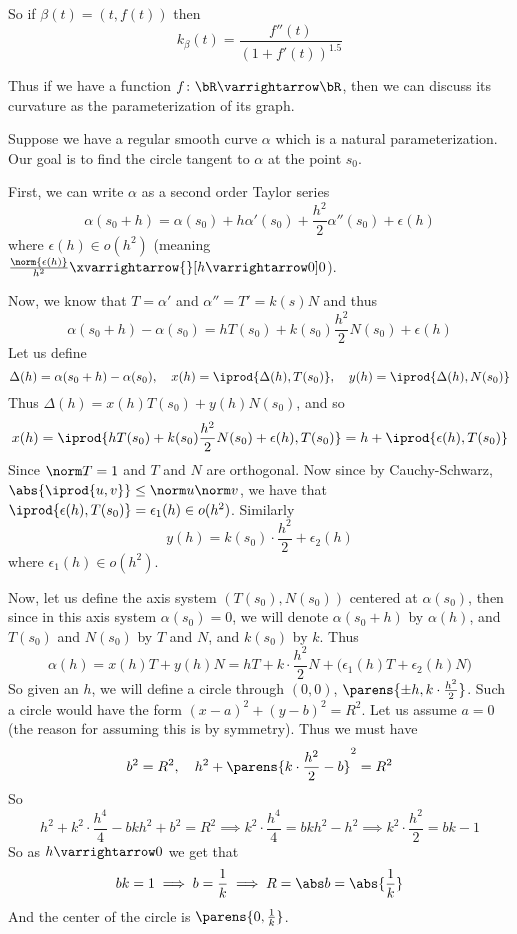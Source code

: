 \documentclass[10pt]{article}
\let\to=\varrightarrow
\begin{document}
\begin{exam*}

    So if $\beta(t)=(t,f(t))$ then
    \[ k_\beta(t) = \frac{f''(t)}{(1+f'(t))^{1.5}} \]

    Thus if we have a function $f\colon\bR\to\bR$, then we can discuss its curvature as the parameterization of its graph.

\end{exam*}

Suppose we have a regular smooth curve $\alpha$ which is a natural parameterization.
Our goal is to find the circle tangent to $\alpha$ at the point $s_0$.
\benum
    \item First, we can write $\alpha$ as a second order Taylor series
    \[ \alpha(s_0+h) = \alpha(s_0) + h\alpha'(s_0) + \frac{h^2}2\alpha''(s_0) + \epsilon(h) \]
    where $\epsilon(h)\in o(h^2)$ (meaning $\frac{\norm{\epsilon(h)}}{h^2}\xvarrightarrow{}[h\to0]0$).

    \item Now, we know that $T=\alpha'$ and $\alpha''=T'=k(s)N$ and thus
    \[ \alpha(s_0+h) - \alpha(s_0) = hT(s_0) + k(s_0)\frac{h^2}2N(s_0) + \epsilon(h) \]
    Let us define
    \[ \Delta(h) = \alpha(s_0+h) - \alpha(s_0),\quad x(h) = \iprod{\Delta(h), T(s_0)},\quad y(h) = \iprod{\Delta(h), N(s_0)} \]
    Thus $\Delta(h)=x(h)T(s_0) + y(h)N(s_0)$, and so
    \[ x(h) = \iprod{hT(s_0) + k(s_0)\frac{h^2}2N(s_0) + \epsilon(h), T(s_0)} = h + \iprod{\epsilon(h), T(s_0)} \]
    Since $\norm T=1$ and $T$ and $N$ are orthogonal.
    Now since by Cauchy-Schwarz, $\abs{\iprod{u,v}}\leq\norm u\norm v$, we have that $\iprod{\epsilon(h), T(s_0)}=\epsilon_1(h)\in o(h^2)$.
    Similarly
    \[ y(h) = k(s_0)\cdot\frac{h^2}2 + \epsilon_2(h) \]
    where $\epsilon_1(h)\in o(h^2)$.

    \item Now, let us define the axis system $(T(s_0),N(s_0))$ centered at $\alpha(s_0)$, then since in this axis system $\alpha(s_0)=0$, we will denote $\alpha(s_0+h)$ by $\alpha(h)$, and $T(s_0)$ and
    $N(s_0)$ by $T$ and $N$, and $k(s_0)$ by $k$.
    Thus
    \[ \alpha(h) = x(h)T + y(h)N = hT + k\cdot\frac{h^2}2N + \bigl(\epsilon_1(h)T + \epsilon_2(h)N\bigr) \]
    So given an $h$, we will define a circle through $(0,0)$, $\parens{\pm h,k\cdot\frac{h^2}2}$.
    Such a circle would have the form $(x-a)^2+(y-b)^2=R^2$.
    Let us assume $a=0$ (the reason for assuming this is by symmetry).
    Thus we must have
    \[ b^2 = R^2,\quad h^2 + \parens{k\cdot\frac{h^2}2-b}^2 = R^2 \]
    So
    \[ h^2 + k^2\cdot\frac{h^4}4 - bkh^2+ b^2 = R^2 \implies k^2\cdot\frac{h^4}4 = bkh^2 - h^2 \implies k^2\cdot\frac{h^2}2 = bk - 1 \]
    So as $h\to0$ we get that
    \[ bk = 1 \implies b=\frac1k \implies R=\abs b=\abs{\frac1k} \]
    And the center of the circle is $\parens{0,\frac1k}$.
\end{document}
